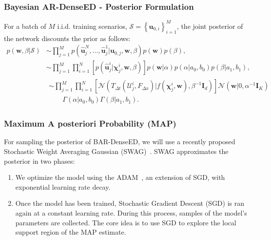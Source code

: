 \documentclass{beamer}
\theoremstyle{remark}
\begin{document}
\begin{frame}
\frametitle{Bayesian AR-DenseED - Posterior Formulation}
For a batch of $M$ i.i.d. training scenarios, $\mathcal{S}=\left\{\bm{u}_{0,i}\right\}_{i=1}^{M}$, the joint posterior of the network discounts the prior as follows:
\begin{align}
    p\left(\textbf{w},\beta|\mathcal{S}\right) & \sim \prod^{M}_{j=1} p\left(\hat{\bm{u}}_{j}^{N}, \ldots, \hat{\bm{u}}_{j}^{1}|\bm{u}_{0,j},\textbf{w},\beta\right)p\left(\textbf{w}\right)p\left(\beta\right),  \nonumber \\ 
    & \sim \prod^{M}_{j=1}\prod_{i=1}^{N}\left[p\left(\hat{\bm{u}}_{j}^{i}|\bm{\chi}_{j}^{i},\textbf{w},\beta\right)\right]p\left(\textbf{w}|\alpha\right)p\left(\alpha|a_{0},b_{0}\right)p\left(\beta|a_{1},b_{1}\right),  \nonumber\\
    & \begin{multlined}\sim \prod^{M}_{j=1}\prod_{i=1}^{N} \left[\mathcal{N}\left(T_{\Delta t}\left(\bm{\mathcal{U}}_{j}^{i}, F_{\Delta x}\right)| f\left(\bm{\chi}_{j}^{i},\textbf{w}\right), \beta^{-1}\bm{I}_{d}\right)\right] \mathcal{N}\left(\mathbf{w}|0, \alpha^{-1}\bm{I}_{K}\right)\\
    \qquad \Gamma\left(\alpha| a_{0}, b_{0}\right) \Gamma\left(\beta|a_{1},b_{1}\right).
    \end{multlined}
    \label{eq:posterior-form}
\end{align}
\end{frame}

\begin{frame}
\frametitle{Maximum A posteriori Probability (MAP)}
For sampling the posterior of BAR-DenseED, we will use a recently proposed Stochastic Weight Averaging Gaussian (SWAG)~\cite{maddox2019simple}.
SWAG approximates the posterior in two phases:
\begin{enumerate}
    \item We optimize the model using the ADAM~\cite{kingma2014adam}, an extension of SGD, with exponential learning rate decay.
    \item Once the model has been trained, Stochastic Gradient Descent (SGD) is ran again at a constant learning rate.
    During this process, samples of the model's parameters are collected.
    The core idea is to use SGD to explore the local support region of the MAP estimate.
\end{enumerate}
\end{frame}
\end{document}
